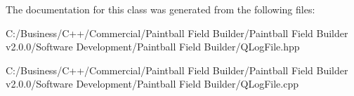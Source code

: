 The documentation for this class was generated from the following files:\begin{DoxyCompactItemize}
\item 
C:/Business/C++/Commercial/Paintball Field Builder/Paintball Field Builder v2.0.0/Software Development/Paintball Field Builder/QLogFile.hpp\item 
C:/Business/C++/Commercial/Paintball Field Builder/Paintball Field Builder v2.0.0/Software Development/Paintball Field Builder/QLogFile.cpp\end{DoxyCompactItemize}
